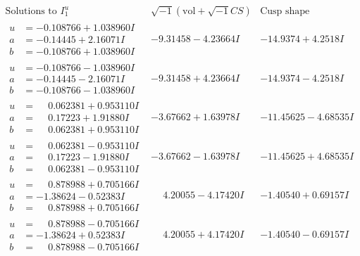 \documentclass[1p]{elsarticle_modified}
\theoremstyle{definition}
\newcommand{\I}{\sqrt{-1}}
\begin{document}
$$\begin{array}{c|c|c}  
\text{Solutions to }I^u_{1}& \I (\text{vol} + \sqrt{-1}CS) & \text{Cusp shape}\\
 \hline 
\begin{aligned}
u &= -0.108766 + 1.038960 I \\
a &= -0.14445 + 2.16071 I \\
b &= -0.108766 + 1.038960 I\end{aligned}
 & -9.31458 - 4.23664 I & -14.9374 + 4.2518 I \\ \hline\begin{aligned}
u &= -0.108766 - 1.038960 I \\
a &= -0.14445 - 2.16071 I \\
b &= -0.108766 - 1.038960 I\end{aligned}
 & -9.31458 + 4.23664 I & -14.9374 - 4.2518 I \\ \hline\begin{aligned}
u &= \phantom{-}0.062381 + 0.953110 I \\
a &= \phantom{-}0.17223 + 1.91880 I \\
b &= \phantom{-}0.062381 + 0.953110 I\end{aligned}
 & -3.67662 + 1.63978 I & -11.45625 - 4.68535 I \\ \hline\begin{aligned}
u &= \phantom{-}0.062381 - 0.953110 I \\
a &= \phantom{-}0.17223 - 1.91880 I \\
b &= \phantom{-}0.062381 - 0.953110 I\end{aligned}
 & -3.67662 - 1.63978 I & -11.45625 + 4.68535 I \\ \hline\begin{aligned}
u &= \phantom{-}0.878988 + 0.705166 I \\
a &= -1.38624 - 0.52383 I \\
b &= \phantom{-}0.878988 + 0.705166 I\end{aligned}
 & \phantom{-}4.20055 - 4.17420 I & -1.40540 + 0.69157 I \\ \hline\begin{aligned}
u &= \phantom{-}0.878988 - 0.705166 I \\
a &= -1.38624 + 0.52383 I \\
b &= \phantom{-}0.878988 - 0.705166 I\end{aligned}
 & \phantom{-}4.20055 + 4.17420 I & -1.40540 - 0.69157 I \\ \hline\begin{aligned}

\end{aligned}
\end{array}$$
\end{document}
